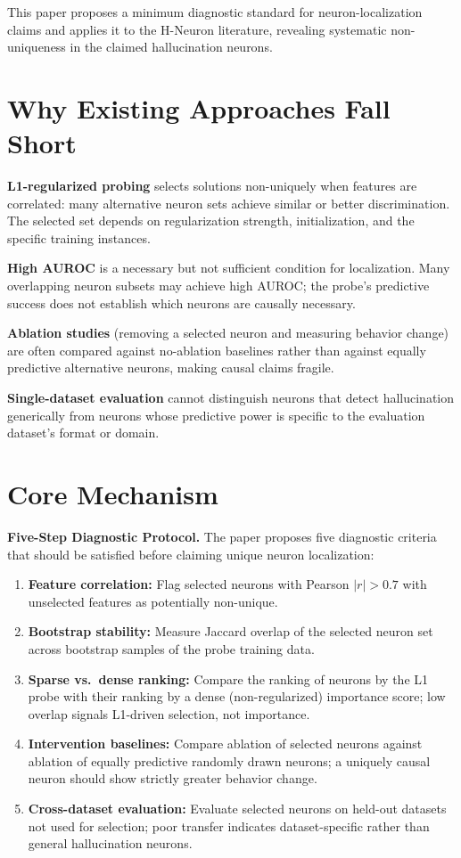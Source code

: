 \documentclass[10pt,twocolumn]{article}
\begin{document}
This paper proposes a minimum diagnostic standard for neuron-localization
claims and applies it to the H-Neuron literature, revealing systematic
non-uniqueness in the claimed hallucination neurons.

\section{Why Existing Approaches Fall Short}

\textbf{L1-regularized probing} selects solutions non-uniquely when features
are correlated: many alternative neuron sets achieve similar or better
discrimination. The selected set depends on regularization strength,
initialization, and the specific training instances.

\textbf{High AUROC} is a necessary but not sufficient condition for
localization. Many overlapping neuron subsets may achieve high AUROC; the
probe's predictive success does not establish which neurons are causally
necessary.

\textbf{Ablation studies} (removing a selected neuron and measuring behavior
change) are often compared against no-ablation baselines rather than against
equally predictive alternative neurons, making causal claims fragile.

\textbf{Single-dataset evaluation} cannot distinguish neurons that detect
hallucination generically from neurons whose predictive power is specific to
the evaluation dataset's format or domain.

\section{Core Mechanism}

\textbf{Five-Step Diagnostic Protocol.} The paper proposes five diagnostic
criteria that should be satisfied before claiming unique neuron localization:

\begin{enumerate}[itemsep=2pt,parsep=0pt]
  \item \textbf{Feature correlation:} Flag selected neurons with Pearson
    $|r|>0.7$ with unselected features as potentially non-unique.
  \item \textbf{Bootstrap stability:} Measure Jaccard overlap of the selected
    neuron set across bootstrap samples of the probe training data.
  \item \textbf{Sparse vs.\ dense ranking:} Compare the ranking of neurons
    by the L1 probe with their ranking by a dense (non-regularized) importance
    score; low overlap signals L1-driven selection, not importance.
  \item \textbf{Intervention baselines:} Compare ablation of selected neurons
    against ablation of equally predictive randomly drawn neurons; a uniquely
    causal neuron should show strictly greater behavior change.
  \item \textbf{Cross-dataset evaluation:} Evaluate selected neurons on
    held-out datasets not used for selection; poor transfer indicates
    dataset-specific rather than general hallucination neurons.
\end{enumerate}
\end{document}
